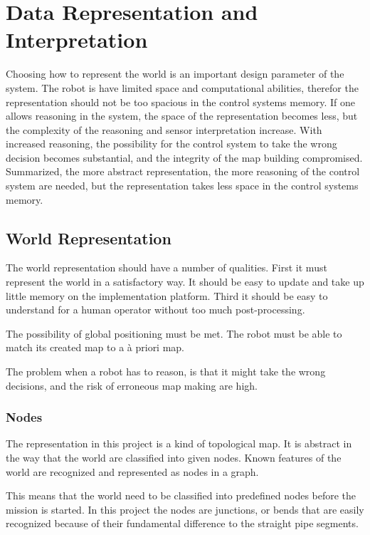 

\chapter{Data Representation and Interpretation}
\label{chap5}
Choosing how to represent the world is an important design parameter of the system. The
robot is have limited space and computational abilities, therefor the representation
should not be too spacious in the control systems memory. If one allows reasoning in the
system, the space of the representation becomes less, but the complexity of the reasoning
and sensor interpretation increase. With increased reasoning, the possibility for the
control system to take the wrong decision becomes substantial, and the integrity of the
map building compromised. Summarized, the more abstract representation, the more reasoning
of the control system are needed, but the representation takes less space in the control
systems memory. 

\section{World Representation}
The world representation should have a number of qualities. First it must represent the
world in a satisfactory way. It should be easy to update and take up little memory on the
implementation platform. Third it should be easy to understand for a human operator
without too much post-processing. 

The possibility of global positioning must be met. The robot must be able to match its
created map to a \`a priori map.

The problem when a robot has to reason, is that it might
take the wrong decisions, and the risk of erroneous map making are high. 

\subsection{Nodes}
The representation in this project is a kind of topological map. It is abstract in the way
that the world are classified into given nodes. Known features of the world are recognized
and represented as nodes in a graph. 

This means that the world need to be classified into predefined nodes before the mission
is started. In this project the nodes are junctions, or bends that are easily recognized
because of their fundamental difference to the straight pipe segments. 

